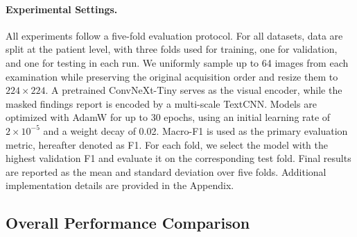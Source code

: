 \paragraph{Experimental Settings.}
All experiments follow a five-fold evaluation protocol. For all datasets, data are split at the patient level, with three folds used for training, one for validation, and one for testing in each run. We uniformly sample up to 64 images from each examination while preserving the original acquisition order and resize them to \(224\times224\). A pretrained ConvNeXt-Tiny serves as the visual encoder, while the masked findings report is encoded by a multi-scale TextCNN. Models are optimized with AdamW for up to 30 epochs, using an initial learning rate of \(2\times10^{-5}\) and a weight decay of 0.02. Macro-F1 is used as the primary evaluation metric, hereafter denoted as F1. For each fold, we select the model with the highest validation F1 and evaluate it on the corresponding test fold. Final results are reported as the mean and standard deviation over five folds. Additional implementation details are provided in the Appendix.


\subsection{Overall Performance Comparison}
\label{sec:overall_comparison}


